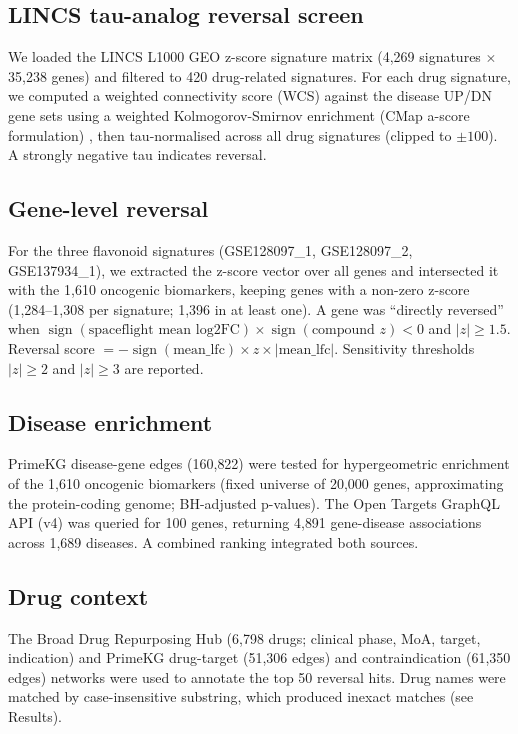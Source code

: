 \documentclass[pdflatex,sn-nature]{sn-jnl}
\begin{document}
\subsection{LINCS tau-analog reversal screen}
We loaded the LINCS L1000 GEO z-score signature matrix (4{,}269 signatures \(\times\)
35{,}238 genes) and filtered to 420 drug-related signatures. For each drug
signature, we computed a weighted connectivity score (WCS) against the disease
UP/DN gene sets using a weighted Kolmogorov-Smirnov enrichment (CMap a-score
formulation) \cite{lamb2006,subramanian2017}, then tau-normalised across all drug
signatures (clipped to \(\pm 100\)). A strongly negative tau indicates reversal.

\subsection{Gene-level reversal}
For the three flavonoid signatures (GSE128097\_1, GSE128097\_2, GSE137934\_1), we
extracted the z-score vector over all genes and intersected it with the 1{,}610
oncogenic biomarkers, keeping genes with a non-zero z-score (1{,}284--1{,}308 per
signature; 1{,}396 in at least one). A gene was ``directly reversed'' when
\(\operatorname{sign}(\text{spaceflight mean log2FC}) \times \operatorname{sign}
(\text{compound } z) < 0\) and \(|z| \geq 1.5\). Reversal score \(=
-\operatorname{sign}(\text{mean\_lfc}) \times z \times |\text{mean\_lfc}|\).
Sensitivity thresholds \(|z| \geq 2\) and \(|z| \geq 3\) are reported.

\subsection{Disease enrichment}
PrimeKG disease-gene edges (160{,}822) \cite{chandak2023} were tested for
hypergeometric enrichment of the 1{,}610 oncogenic biomarkers (fixed universe of
20{,}000 genes, approximating the protein-coding genome; BH-adjusted p-values). The Open Targets GraphQL API
(v4) \cite{ochoa2023} was queried for 100 genes, returning 4{,}891 gene-disease
associations across 1{,}689 diseases. A combined ranking integrated both sources.

\subsection{Drug context}
The Broad Drug Repurposing Hub (6{,}798 drugs; clinical phase, MoA, target,
indication) and PrimeKG drug-target (51{,}306 edges) and contraindication (61{,}350
edges) networks were used to annotate the top 50 reversal hits. Drug names were
matched by case-insensitive substring, which produced inexact matches (see
Results).
\end{document}
